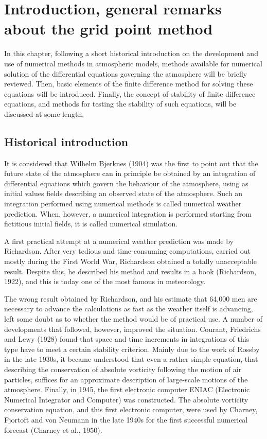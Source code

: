 \section{Introduction, general remarks about the grid point
method}\label{Chapter1}

In this chapter, following a short historical introduction on the
development and use of numerical methods in atmospheric models, methods
available for numerical solution of the differential equations governing
the atmosphere will be briefly reviewed. Then, basic elements of the
finite difference method for solving these equations will be introduced.
Finally, the concept of stability of finite difference equations, and
methods for testing the stability of such equations, will be discussed
at some length.

\subsection{\texorpdfstring{\textbf{Historical
introduction}}{Historical introduction}}\label{historical-introduction}

It is considered that Wilhelm Bjerknes (1904) was the first to point out
that the future state of the atmosphere can in principle be obtained by
an integration of differential equations which govern the behaviour of
the atmosphere, using as initial values fields describing an observed
state of the atmosphere. Such an integration performed using numerical
methods is called numerical weather prediction. When, however, a
numerical integration is performed starting from fictitious initial
fields, it is called numerical simulation.

A first practical attempt at a numerical weather prediction was made by
Richardson. After very tedious and time-consuming computations, carried
out mostly during the First World War, Richardson obtained a totally
unacceptable result. Despite this, he described his method and results
in a book (Richardson, 1922), and this is today one of the most famous
in meteorology.

The wrong result obtained by Richardson, and his estimate that 64,000
men are necessary to advance the calculations as fast as the weather
itself is advancing, left some doubt as to whether the method would be
of practical use. A number of developments that followed, however,
improved the situation. Courant, Friedrichs and Lewy (1928) found that
space and time increments in integrations of this type have to meet a
certain stability criterion. Mainly due to the work of Rossby in the
late 1930\textquotesingle s, it became understood that even a rather
simple equation, that describing the conservation of absolute vorticity
following the motion of air particles, suffices for an approximate
description of large-scale motions of the atmosphere. Finally, in 1945,
the first electronic computer ENIAC (Electronic Numerical Integrator and
Computer) was constructed. The absolute vorticity conservation equation,
and this first electronic computer, were used by Charney, Fjortoft and
von Neumann in the late 1940\textquotesingle s for the first successful
numerical forecast (Charney et al., 1950).

